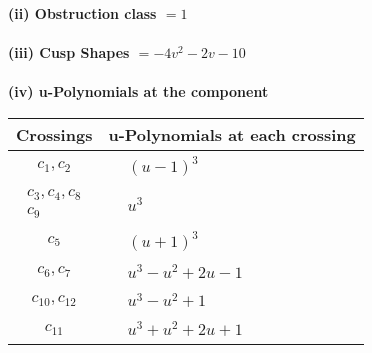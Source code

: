 \documentclass[1p]{elsarticle_modified}
\theoremstyle{definition}
\begin{document}
\flushleft \textbf{(ii) Obstruction class $= 1$}\\~\\
\flushleft \textbf{(iii) Cusp Shapes $= -4 v^2-2 v-10$}\\~\\
\newpage\renewcommand{\arraystretch}{1}
\flushleft \textbf{(iv) u-Polynomials at the component}\newline \\
\begin{tabular}{m{50pt}|m{274pt}}
Crossings & \hspace{64pt}u-Polynomials at each crossing \\
\hline $$\begin{aligned}c_{1},c_{2}\end{aligned}$$&$\begin{aligned}
&(u-1)^3
\end{aligned}$\\
\hline $$\begin{aligned}c_{3},c_{4},c_{8}\\c_{9}\end{aligned}$$&$\begin{aligned}
&u^3
\end{aligned}$\\
\hline $$\begin{aligned}c_{5}\end{aligned}$$&$\begin{aligned}
&(u+1)^3
\end{aligned}$\\
\hline $$\begin{aligned}c_{6},c_{7}\end{aligned}$$&$\begin{aligned}
&u^3- u^2+2 u-1
\end{aligned}$\\
\hline $$\begin{aligned}c_{10},c_{12}\end{aligned}$$&$\begin{aligned}
&u^3- u^2+1
\end{aligned}$\\
\hline $$\begin{aligned}c_{11}\end{aligned}$$&$\begin{aligned}
&u^3+u^2+2 u+1
\end{aligned}$\\
\hline
\end{tabular}\\~\\
\end{document}
